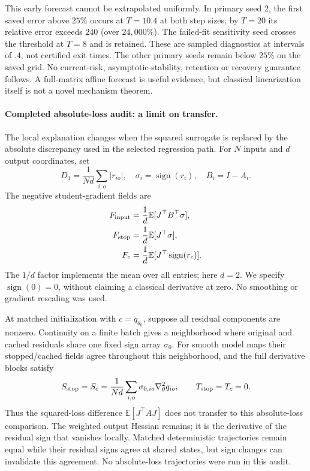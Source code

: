 \documentclass[11pt,a4paper]{article}
\newcommand{\E}{\mathbb{E}}
\begin{document}
This early forecast cannot be extrapolated uniformly. In primary seed 2,
the first saved error above $25\%$ occurs at $T=10.4$ at both step sizes;
by $T=20$ its relative error exceeds $240$ (over $24{,}000\%$). The
failed-fit sensitivity seed crosses the threshold at $T=8$ and is retained.
These are sampled diagnostics at intervals of $.4$, not certified exit
times. The other primary seeds remain below $25\%$ on the saved grid.
No current-risk, asymptotic-stability, retention or recovery guarantee
follows. A full-matrix affine forecast is useful evidence, but classical
linearization itself is not a novel mechanism theorem.

\paragraph{Completed absolute-loss audit: a limit on transfer.}
The local explanation changes when the squared surrogate is replaced by
the absolute discrepancy used in the selected regression path. For $N$
inputs and $d$ output coordinates, set
\[
 D_1=\frac1{Nd}\sum_{i,o}|r_{io}|,\quad
 \sigma_i=\operatorname{sign}(r_i),\quad B_i=I-A_i.
\]
The negative student-gradient fields are
\begin{align*}
 F_{\rm input}&=\frac1d\E[J^\top B^\top\sigma],\\
 F_{\rm stop}&=\frac1d\E[J^\top\sigma],\\
 F_c&=\frac1d\E[J^\top\operatorname{sign}(r_c)].
\end{align*}
The $1/d$ factor implements the mean over all entries; here $d=2$.
We specify $\operatorname{sign}(0)=0$, without claiming a classical
derivative at zero. No smoothing or gradient rescaling was used.

At matched initialization with $c=q_{\theta_0}$, suppose all residual
components are nonzero. Continuity on a finite batch gives a neighborhood
where original and cached residuals share one fixed sign array $\sigma_0$.
For smooth model maps their stopped/cached fields agree throughout this
neighborhood, and the full derivative blocks satisfy
\[
 S_{\rm stop}=S_c=\frac1{Nd}\sum_{i,o}\sigma_{0,io}
 \nabla_\theta^2 q_{io},\qquad T_{\rm stop}=T_c=0.
\]
Thus the squared-loss difference $\E[J^\top A J]$ does not transfer to
this absolute-loss comparison. The weighted output Hessian remains;
it is the derivative of the residual sign that vanishes locally.
Matched deterministic trajectories remain equal while their residual
signs agree at shared states, but sign changes can invalidate this
agreement. No absolute-loss trajectories were run in this audit.
\end{document}

